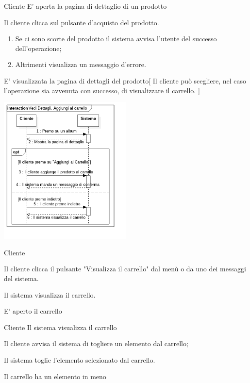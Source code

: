     {Cliente}
    {E' aperta la pagina di dettaglio di un prodotto}
    {   \item Il cliente clicca sul pulsante d'acquisto del prodotto.
        \begin{enumerate}[label*=\arabic*.]
            \item Se ci sono scorte del prodotto il sistema avvisa l'\gls{utente} del successo dell'operazione;
            \item Altrimenti visualizza un messaggio d'errore.
        \end{enumerate}
    }
    {E' visualizzata la pagina di dettagli del prodotto}[
        Il cliente può scegliere, nel caso l'operazione sia avvenuta con successo, di visualizzare il carrello.
    ]
    
\begin{center}
    \includegraphics[width=0.5\textwidth]{diagram/seq-uc2-uc3.png}
\end{center}
    
    {Cliente}
    {}
    {   \item Il cliente clicca il pulsante "Visualizza il carrello" dal menù o da uno dei messaggi del sistema.
        \item Il sistema visualizza il carrello.
    }
    {E' aperto il carrello}
    
    {Cliente}
    {Il sistema visualizza il carrello}
    {   \item Il cliente avvisa il sistema di togliere un elemento dal carrello;
        \item Il sistema toglie l'elemento selezionato dal carrello.
    }
    {Il carrello ha un elemento in meno}

